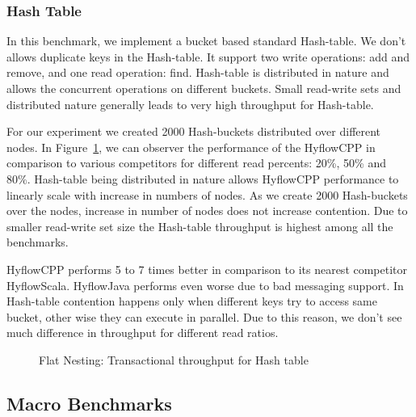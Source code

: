 \documentclass[12pt,english]{report}
\begin{document}
\subsubsection{Hash Table}
In this benchmark, we implement a bucket based standard Hash-table. We don't allows duplicate keys in the Hash-table. It support two write operations: add and remove, and one read operation: find. Hash-table is distributed in nature and allows the concurrent operations on different buckets. Small read-write sets and distributed nature generally leads to very high throughput for Hash-table.

For our experiment we created 2000 Hash-buckets distributed over different nodes. In Figure~\ref{Fig:flatHashTable}, we can observer the performance of the HyflowCPP in comparison to various competitors for different read percents: 20\%, 50\% and 80\%. Hash-table being distributed in nature allows HyflowCPP performance to linearly scale with increase in numbers of nodes. As we create 2000 Hash-buckets over the nodes, increase in number of nodes does not increase contention. Due to smaller read-write set size the Hash-table throughput is highest among all the benchmarks.

HyflowCPP performs 5 to 7 times better in comparison to its nearest competitor HyflowScala. HyflowJava performs even worse due to bad messaging support. In Hash-table contention happens only when different keys try to access same bucket, other wise they can execute in parallel. Due to this reason, we don't see much difference in throughput for different read ratios.

\begin{figure}[H]
\centering
{}
\end{figure}
\begin{figure}[H]
\centering
{}
\end{figure}
\begin{figure}[H]
\centering
{}
\caption{Flat Nesting: Transactional throughput for Hash table}
\label{Fig:flatHashTable}
\end{figure}

\subsection{Macro Benchmarks}
\end{document}

